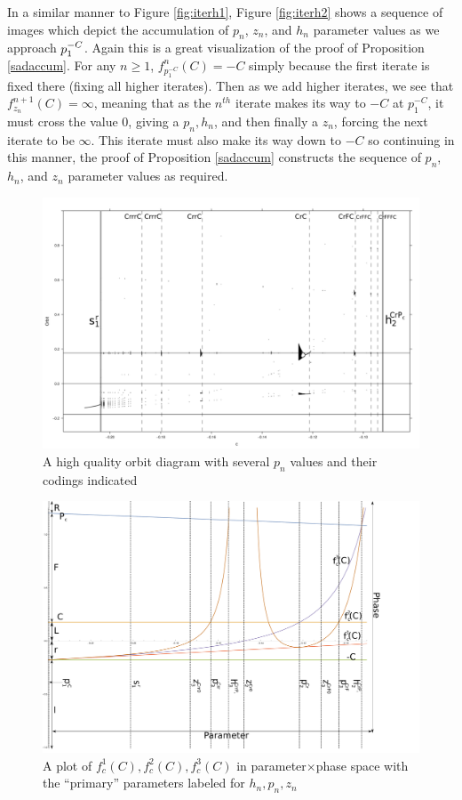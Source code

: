 In a similar manner to Figure \ref{fig:iterh1}, Figure \ref{fig:iterh2} shows a sequence of images which depict the accumulation of $p_n$, $z_n$, and $h_n$ parameter values as we approach $p^{-C}_1$. Again this is a great visualization of the proof of Proposition \ref{sadaccum}. For any $n \geq 1$, $f^n_{p_1^{-C}} (C) = -C$ simply because the first iterate is fixed there (fixing all higher iterates). Then as we add higher iterates, we see that $f^{n+1}_{z_n} (C) = \infty$, meaning that as the $n^{th}$ iterate makes its way to $-C$ at $p_1^{-C}$, it must cross the value $0$, giving a $p_n, h_n$, and then finally a $z_n$, forcing the next iterate to be $\infty$. This iterate must also make its way down to $-C$ so continuing in this manner, the proof of Proposition \ref{sadaccum} constructs the sequence of $p_n$, $h_n$, and $z_n$ parameter values as required.
\begin{figure}
	\includegraphics[width=\textheight]{./img/over.png}
	\caption{A high quality orbit diagram with several $p_n$ values and their codings indicated}
	\label{hqorb}
\end{figure}

\begin{figure}
	\includegraphics[width=\textheight]{./img/cs2}
	\caption{A plot of $f^1_c (C),f^2_c (C),f^3_c (C)$ in parameter$\times$phase space with the ``primary'' parameters labeled for $h_n,p_n,z_n$}
	\label{hqcplot}
\end{figure}

